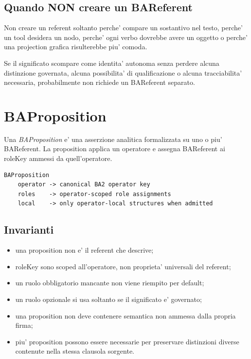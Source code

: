 \documentclass[11pt,a4paper]{article}
\providecommand{\BAP}{\textit{BAProposition}}
\providecommand{\stabletag}{\ddtatag{DDTAGreen}{CURRENT / PRESERVED}}
\begin{document}
\subsection{Quando NON creare un BAReferent}
Non creare un referent soltanto perche' compare un sostantivo nel testo, perche' un tool desidera un nodo, perche' ogni verbo dovrebbe avere un oggetto o perche' una projection grafica risulterebbe piu' comoda.

\begin{ddtacore}[title={Identity test}]
Se il significato scompare come identita' autonoma senza perdere alcuna distinzione governata, alcuna possibilita' di qualificazione o alcuna tracciabilita' necessaria, probabilmente non richiede un BAReferent separato.
\end{ddtacore}

\section{BAProposition}
\stabletag

Una \BAP{} e' una asserzione analitica formalizzata su uno o piu' BAReferent. La proposition applica un operatore e assegna BAReferent ai roleKey ammessi da quell'operatore.

\begin{lstlisting}
BAProposition
    operator -> canonical BA2 operator key
    roles    -> operator-scoped role assignments
    local    -> only operator-local structures when admitted
\end{lstlisting}

\subsection{Invarianti}
\begin{itemize}
  \item una proposition non e' il referent che descrive;
  \item roleKey sono scoped all'operatore, non proprieta' universali del referent;
  \item un ruolo obbligatorio mancante non viene riempito per default;
  \item un ruolo opzionale si usa soltanto se il significato e' governato;
  \item una proposition non deve contenere semantica non ammessa dalla propria firma;
  \item piu' proposition possono essere necessarie per preservare distinzioni diverse contenute nella stessa clausola sorgente.
\end{itemize}
\end{document}
